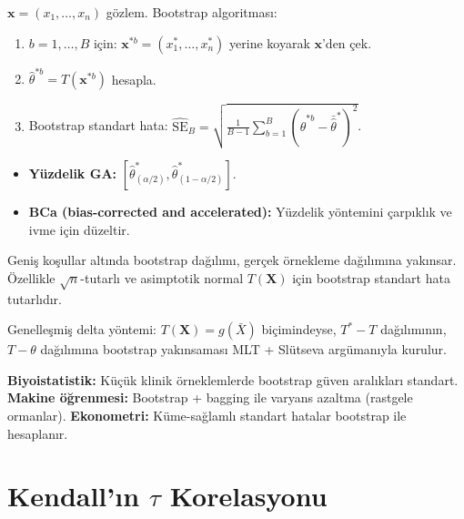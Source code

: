 \begin{tanim}[Bootstrap]\label{def:bootstrap}
$\mathbf{x}=(x_1,\ldots,x_n)$ gözlem. Bootstrap algoritması:
\begin{enumerate}
  \item $b=1,\ldots,B$ için: $\mathbf{x}^{*b}=(x_1^*,\ldots,x_n^*)$ yerine koyarak $\mathbf{x}$'den çek.
  \item $\hat\theta^{*b} = T(\mathbf{x}^{*b})$ hesapla.
  \item Bootstrap standart hata: $\hat{\mathrm{SE}}_B = \sqrt{\frac{1}{B-1}\sum_{b=1}^B(\hat\theta^{*b}-\bar{\hat\theta}^*)^2}$.
\end{enumerate}
\end{tanim}

\begin{tanim}\label{def:bootstrap_ga}
\begin{itemize}
  \item \textbf{Yüzdelik GA:} $[\hat\theta^*_{(\alpha/2)}, \hat\theta^*_{(1-\alpha/2)}]$.
  \item \textbf{BCa (bias-corrected and accelerated):} Yüzdelik yöntemini çarpıklık ve ivme için düzeltir.
\end{itemize}
\end{tanim}

\begin{teorem}\label{thm:bootstrap_tutarlilik}
Geniş koşullar altında bootstrap dağılımı, gerçek örnekleme dağılımına yakınsar. Özellikle $\sqrt{n}$-tutarlı ve asimptotik normal $T(\mathbf{X})$ için bootstrap standart hata tutarlıdır.
\end{teorem}

\begin{ispatiskele}
Genelleşmiş delta yöntemi: $T(\mathbf{X})=g(\bar{X})$ biçimindeyse, $T^* - T$ dağılımının, $T - \theta$ dağılımına bootstrap yakınsaması MLT + Slütseva argümanıyla kurulur.
\end{ispatiskele}

\begin{disiplinlerarasibaglan}
\textbf{Biyoistatistik:} Küçük klinik örneklemlerde bootstrap güven aralıkları standart. \textbf{Makine öğrenmesi:} Bootstrap + bagging ile varyans azaltma (rastgele ormanlar). \textbf{Ekonometri:} Küme-sağlamlı standart hatalar bootstrap ile hesaplanır.
\end{disiplinlerarasibaglan}

\section{Kendall'ın $\tau$ Korelasyonu}
\label{sec:kendall_tau}

